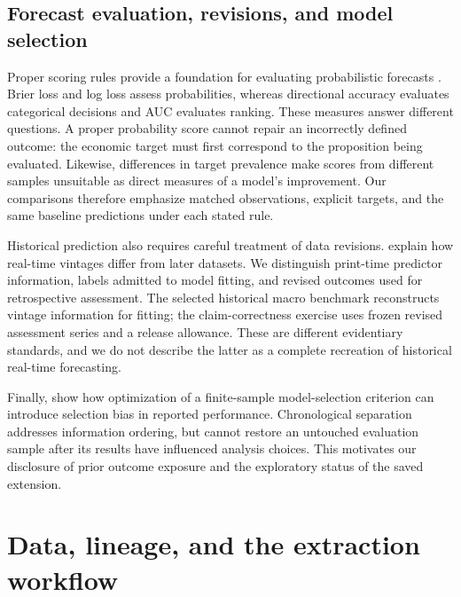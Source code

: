 \documentclass[iicol,pdflatex,sn-mathphys-num]{sn-jnl}
\begin{document}
\subsection{Forecast evaluation, revisions, and model selection}
Proper scoring rules provide a foundation for evaluating probabilistic forecasts \citep{gneiting2007}. Brier loss and log loss assess probabilities, whereas directional accuracy evaluates categorical decisions and AUC evaluates ranking. These measures answer different questions. A proper probability score cannot repair an incorrectly defined outcome: the economic target must first correspond to the proposition being evaluated. Likewise, differences in target prevalence make scores from different samples unsuitable as direct measures of a model's improvement. Our comparisons therefore emphasize matched observations, explicit targets, and the same baseline predictions under each stated rule.

Historical prediction also requires careful treatment of data revisions. \citet{croushore1999} explain how real-time vintages differ from later datasets. We distinguish print-time predictor information, labels admitted to model fitting, and revised outcomes used for retrospective assessment. The selected historical macro benchmark reconstructs vintage information for fitting; the claim-correctness exercise uses frozen revised assessment series and a release allowance. These are different evidentiary standards, and we do not describe the latter as a complete recreation of historical real-time forecasting.

Finally, \citet{cawley2010} show how optimization of a finite-sample model-selection criterion can introduce selection bias in reported performance. Chronological separation addresses information ordering, but cannot restore an untouched evaluation sample after its results have influenced analysis choices. This motivates our disclosure of prior outcome exposure and the exploratory status of the saved extension. 

\section{Data, lineage, and the extraction workflow}
\end{document}
